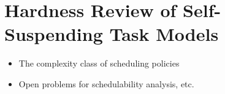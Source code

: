 \section{Hardness Review of Self-Suspending Task Models}
  
\begin{itemize}
\item The complexity class of scheduling policies
\item Open problems for schedulability analysis, etc.
\end{itemize}